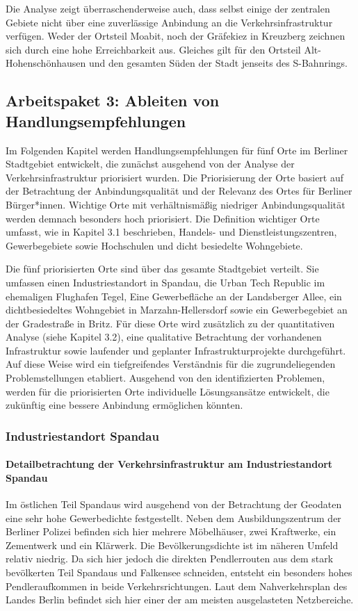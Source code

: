Die Analyse zeigt überraschenderweise auch, dass selbst einige der zentralen Gebiete nicht über eine zuverlässige Anbindung an die Verkehrsinfrastruktur verfügen. Weder der Ortsteil Moabit, noch der Gräfekiez in Kreuzberg zeichnen sich durch eine hohe Erreichbarkeit aus. Gleiches gilt für den Ortsteil Alt-Hohenschönhausen und den gesamten Süden der Stadt jenseits des S-Bahnrings.

\subsection{Arbeitspaket 3: Ableiten von Handlungsempfehlungen}

Im Folgenden Kapitel werden Handlungsempfehlungen für fünf Orte im Berliner Stadtgebiet entwickelt, die zunächst ausgehend von der Analyse der Verkehrsinfrastruktur priorisiert wurden. Die Priorisierung der Orte basiert auf der Betrachtung der Anbindungsqualität und der Relevanz des Ortes für Berliner Bürger*innen. Wichtige Orte mit verhältnismäßig niedriger Anbindungsqualität werden demnach besonders hoch priorisiert. Die Definition wichtiger Orte umfasst, wie in Kapitel 3.1 beschrieben, Handels- und Dienstleistungszentren, Gewerbegebiete sowie Hochschulen und dicht besiedelte Wohngebiete. 

Die fünf priorisierten Orte sind über das gesamte Stadtgebiet verteilt. Sie umfassen einen Industriestandort in Spandau, die Urban Tech Republic im ehemaligen Flughafen Tegel, Eine Gewerbefläche an der Landsberger Allee, ein dichtbesiedeltes Wohngebiet in Marzahn-Hellersdorf sowie ein Gewerbegebiet an der Gradestraße in Britz. Für diese Orte wird zusätzlich zu der quantitativen Analyse (siehe Kapitel 3.2), eine qualitative Betrachtung der vorhandenen Infrastruktur sowie laufender und geplanter Infrastrukturprojekte durchgeführt. Auf diese Weise wird ein tiefgreifendes Verständnis für die zugrundeliegenden Problemstellungen etabliert. Ausgehend von den identifizierten Problemen, werden für die priorisierten Orte individuelle Lösungsansätze entwickelt, die zukünftig eine bessere Anbindung ermöglichen könnten.

\subsubsection{Industriestandort Spandau}
\paragraph{Detailbetrachtung der Verkehrsinfrastruktur am Industriestandort Spandau}
Im östlichen Teil Spandaus wird ausgehend von der Betrachtung der Geodaten eine sehr hohe Gewerbedichte festgestellt. Neben dem Ausbildungszentrum der Berliner Polizei befinden sich hier mehrere Möbelhäuser, zwei Kraftwerke, ein Zementwerk und ein Klärwerk. Die Bevölkerungsdichte ist im näheren Umfeld relativ niedrig. Da sich hier jedoch die direkten Pendlerrouten aus dem stark bevölkerten Teil Spandaus und Falkensee schneiden, entsteht ein besonders hohes Pendleraufkommen in beide Verkehrsrichtungen. Laut dem Nahverkehrsplan des Landes Berlin befindet sich hier einer der am meisten ausgelasteten Netzbereiche.

